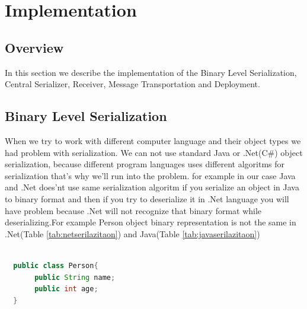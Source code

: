 

\chapter{Implementation}
\label{chapter:implementation}

\section{Overview}
\label{section:overview}

In this section we describe the implementation of the Binary Level Serialization, Central Serializer, Receiver,
 Message Transportation and Deployment.

\section{Binary Level Serialization}
\label{section:binaryLevelSerialization}
When we try to work with different computer language and their object types we had problem with serialization.
We can not use standard Java or .Net(C\#) object serialization, because different program languages uses different algoritms
for serialization that's why we’ll run into the problem. for example in our case Java and .Net does'nt use same serialization
algoritm if you serialize an object in Java to binary format and then if you try to deserialize it in .Net language you
will have problem because .Net will not recognize that binary format while deserializing.For example
Person object binary representation is not the same in .Net(Table \ref{tab:netserilazitaon}) and
Java(Table \ref{tab:javaserilazitaon})

\begin{lstlisting}[language=Java, caption={Person Object}]

  public class Person{
       public String name;
       public int age;
  }

\end{lstlisting}

